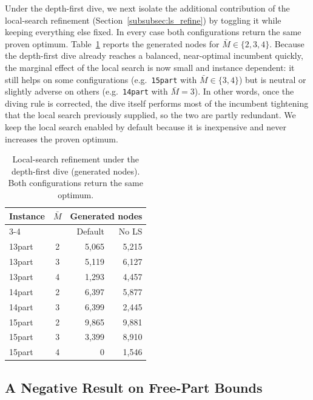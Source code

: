 \documentclass[letterpaper, 10 pt, conference]{ieeeconf}  %
\begin{document}
Under the depth-first dive, we next isolate the additional contribution of the
local-search refinement (Section~\ref{subsubsec:ls_refine}) by toggling it while
keeping everything else fixed. In every case both configurations return the same
proven optimum. Table~\ref{tab:ls} reports the generated nodes for
$\bar M\in\{2,3,4\}$. Because the depth-first dive already reaches a balanced,
near-optimal incumbent quickly, the marginal effect of the local search is now
small and instance dependent: it still helps on some configurations (e.g.\
\texttt{15part} with $\bar M\in\{3,4\}$) but is neutral or slightly adverse on
others (e.g.\ \texttt{14part} with $\bar M=3$). In other words, once the diving
rule is corrected, the dive itself performs most of the incumbent tightening that
the local search previously supplied, so the two are partly redundant. We keep
the local search enabled by default because it is inexpensive and never increases
the proven optimum.

\begin{table}[t]
\centering
\caption{Local-search refinement under the depth-first dive (generated nodes).
Both configurations return the same optimum.}
\label{tab:ls}
\begin{tabular}{l c r r}
\toprule
\multirow{2}{*}{Instance} & \multirow{2}{*}{$\bar M$}
 & \multicolumn{2}{c}{Generated nodes} \\
\cmidrule(lr){3-4}
 & & Default & No LS \\
\midrule
13part & 2 & 5{,}065 & 5{,}215 \\
13part & 3 & 5{,}119 & 6{,}127 \\
13part & 4 & 1{,}293 & 4{,}457 \\
14part & 2 & 6{,}397 & 5{,}877 \\
14part & 3 & 6{,}399 & 2{,}445 \\
15part & 2 & 9{,}865 & 9{,}881 \\
15part & 3 & 3{,}399 & 8{,}910 \\
15part & 4 & 0       & 1{,}546 \\
\bottomrule
\end{tabular}
\end{table}

\subsection{A Negative Result on Free-Part Bounds}
\label{subsec:res_freepar}
\end{document}
